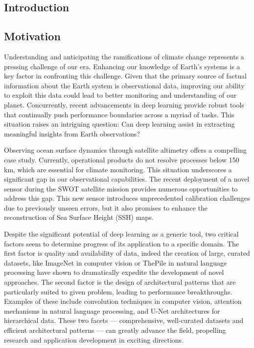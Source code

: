 \begin{bibunit}

\chapter*{Introduction}


\section*{Motivation}

Understanding and anticipating the ramifications of climate change represents a pressing challenge of our era. Enhancing our knowledge of Earth's systems is a key factor in confronting this challenge. Given that the primary source of factual information about the Earth system is observational data, improving our ability to exploit this data could lead to better monitoring and understanding of our planet. Concurrently, recent advancements in deep learning provide robust tools that continually push performance boundaries across a myriad of tasks. This situation raises an intriguing question: Can deep learning assist in extracting meaningful insights from Earth observations?

Observing ocean surface dynamics through satellite altimetry offers a compelling case study. Currently, operational products do not resolve processes below 150 km, which are essential for climate monitoring. This situation underscores a significant gap in our observational capabilities. The recent deployment of a novel sensor during the SWOT satellite mission provides numerous opportunities to address this gap. This new sensor introduces unprecedented calibration challenges due to previously unseen errors, but it also promises to enhance the reconstruction of Sea Surface Height (SSH) maps.

Despite the significant potential of deep learning as a generic tool, two critical factors seem to determine progress of its application to a specific domain. The first factor is quality and availability of data, indeed the creation of large, curated datasets, like ImageNet in computer vision or ThePile in natural language processing have shown to dramatically expedite the development of novel approaches. The second factor is the design of architectural patterns that are particularly suited to given problem, leading to performance breakthroughs. Examples of these include convolution techniques in computer vision, attention mechanisms in natural language processing, and U-Net architectures for hierarchical data. These two facets — comprehensive, well-curated datasets and efficient architectural patterns — can greatly advance the field, propelling research and application development in exciting directions.


\end{bibunit}
